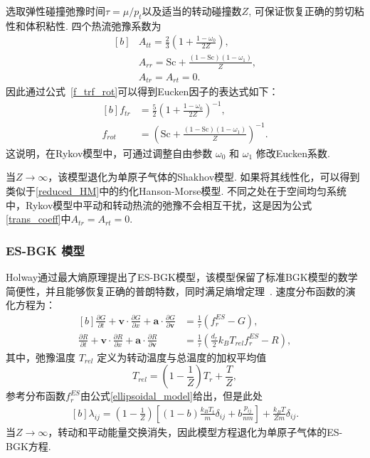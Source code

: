 选取弹性碰撞弛豫时间$\tau={\mu}/{p_t}$以及适当的转动碰撞数$Z$, 可保证恢复正确的剪切粘性和体积粘性.
四个热流弛豫系数为
\begin{equation}
\begin{aligned}[b]
&A_{tt}=\frac{2}{3}\left(1+\frac{1-\omega_0}{2Z}\right),\\ &A_{rr}=\text{Sc}+\frac{(1-\text{Sc})(1-\omega_1)}{Z},\\
&A_{tr}=A_{rt}=0.
\end{aligned}
\end{equation}
因此通过公式~\eqref{f_trf_rot}可以得到Eucken因子的表达式如下：
\begin{equation}\label{Rykov_f}
\begin{aligned}[b]
f_{tr}&=\frac{5}{2}\left(1+\frac{1-\omega_0}{2Z}\right)^{-1},\\
f_{rot}&=\left(\text{Sc}+\frac{(1-\text{Sc})(1-\omega_1)}{Z}\right)^{-1}.
\end{aligned}
\end{equation}
这说明，在Rykov模型中，可通过调整自由参数 $ \omega_0 $ 和 $ \omega_1 $ 修改Eucken系数.

当$Z\rightarrow\infty$，该模型退化为单原子气体的Shakhov模型. 如果将其线性化，可以得到类似于\ref{reduced_HM}中的约化Hanson-Morse模型. 不同之处在于空间均匀系统中，Rykov模型中平动和转动热流的弛豫不会相互干扰，这是因为公式\eqref{trans_coeff}中$A_{tr}=A_{rt}=0$.


\subsubsection{ES-BGK 模型}

Holway通过最大熵原理提出了ES-BGK模型，该模型保留了标准BGK模型的数学简便性，并且能够恢复正确的普朗特数，同时满足熵增定理~\cite{holway1966new,andries2000gaussian}. 速度分布函数的演化方程为：
\begin{equation}
\begin{aligned}[b]
\frac{\partial G}{\partial t}+\bm{v}\cdot \frac{\partial G}{\partial x} +\bm{a}\cdot \frac{\partial G}{\partial \bm{v}}&=\frac{1}{ \tau  }\left(f_r^{ES}-G\right),\\
\frac{\partial R}{\partial t}+\bm{v}\cdot \frac{\partial R}{\partial x}+\bm{a}\cdot \frac{\partial R}{\partial \bm{v}}&=\frac{1}{ \tau }\left(\frac{d_r}{2}k_BT_{rel}f_r^{ES}-R\right),
\end{aligned}
\end{equation}
其中，弛豫温度 $T_{rel}$ 定义为转动温度与总温度的加权平均值 
\begin{equation}
T_{rel}=\left(1-\frac{1}{Z}\right){T_r}+\frac{T}{Z},
\end{equation}
参考分布函数$f_r^{ES}$由公式\eqref{ellipsoidal_model}给出，但是此处
\begin{equation}\label{Gaussian}
\begin{aligned}[b]
\lambda_{ij}=\left(1-\frac{1}{Z}\right)
\left[(1-b)\frac{k_BT_t}{m}\delta_{ij}+b\frac{p_{ij}}{nm}\right]
+\frac{k_BT}{Zm}\delta_{ij}.
\end{aligned}
\end{equation}
当$Z\rightarrow\infty$，转动和平动能量交换消失，因此模型方程退化为单原子气体的ES-BGK方程.

